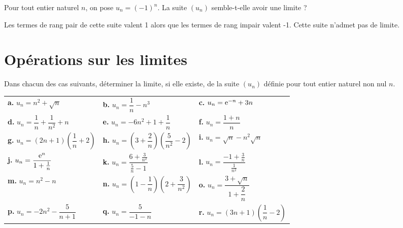 \documentclass[11pt,fleqn]{book} %
\begin{document}
\begin{exercise}Pour tout entier naturel $n$, on pose $u_n=(-1)^n$. La suite $(u_n)$ semble-t-elle avoir une limite ?\end{exercise}
\begin{solution}Les termes de rang pair de cette suite valent 1 alors que les termes de rang impair valent -1. Cette suite n'admet pas de limite.\end{solution}



\section*{Opérations sur les limites}

\begin{exercise}Dans chacun des cas suivants, déterminer la limite, si elle existe, de la suite $(u_n)$  définie pour tout entier naturel non nul $n$.

\renewcommand{\arraystretch}{2.5}
\begin{tabularx}{\linewidth}{XXX}
\textbf{a.}  $u_n= n^2+\sqrt{n}$ & \textbf{b.} $u_n = \dfrac{1}{n}-n^3$ & \textbf{c.} $u_n = \mathrm{e}^{-n}+3n$ \\
\textbf{d.} $u_n = \dfrac{1}{n} + \dfrac{1}{n^2}+n$ & \textbf{e.} $ u_n =-6n^2+1+ \dfrac{1}{n}$ & \textbf{f.} $u_n=\dfrac{1+n}{n}$\\
\textbf{g.} $u_n = (2n+1)\left(\dfrac{1}{	n}+2\right)$ & \textbf{h.} $ u_n = \left(3+\dfrac{2}{n}\right) \left( \dfrac{5}{n^2}-2\right)$ & \textbf{i.} $u_n=\sqrt{n}-n^2\sqrt{n}$\\
\textbf{j.} $ u_n = \dfrac{\mathrm{e}^n}{1+\frac{1}{n}}$ & \textbf{k.} $ u_n = \dfrac{6+\frac{3}{n^2}}{\frac{5}{n}-1}$ &
\textbf{l.} $ u_n = \dfrac{-1+\frac{3}{n}}{\frac{1}{n^2}}$ \\

\textbf{m.} $u_n=n^2-n$ & \textbf{n.} $u_n=\left(1-\dfrac{1}{n}\right)\left(2+\dfrac{3}{n^2}\right)$ & 
\textbf{o.} $u_n=\dfrac{3+\sqrt{n}}{1+\dfrac{2}{n}}$\\
\textbf{p.} $u_n=-2n^2-\dfrac{5}{n+1}$ & \textbf{q.} $u_n=\dfrac{5}{-1-n}$ & \textbf{r.} $u_n = (3n+1)\left(\dfrac{1}{n}-2\right)$
\end{tabularx}
\end{exercise}
\end{document}
